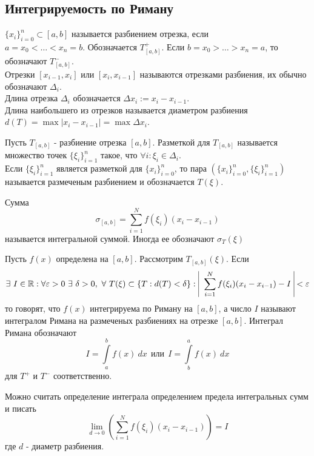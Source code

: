 \subsection{Интегрируемость по Риману}
\begin{definition}
    $\{x_i\}_{i=0}^n\subset [a,b]$ называется разбиением отрезка, если \\
    $a=x_0<\dots<x_n=b$. Обозначается $T_{[a,b]}^+$. Если $b=x_0>\dots>x_n=a$, то обозначают $T_{[a,b]}^-$.\\
    Отрезки $[x_{i-1},x_i]$ или $[x_i, x_{i-1}]$ называются отрезками разбиения, их обычно обозначают $\Delta_i$.\\
    Длина отрезка $\Delta_i$ обозначается $\Delta x_i := x_i-x_{i-1}$. \\
    Длина наибольшего из отрезков называется диаметром разбиения \\
    $d(T)=\max|x_i-x_{i-1}| = \max{\Delta x_i}$. 
\end{definition} 
\begin{definition}
    Пусть $T_{[a,b]}$ - разбиение отрезка $[a,b]$. Разметкой для $T_{[a,b]}$ называется множество точек $\{\xi_i\}_{i=1}^n$ такое, что $\forall i: \xi_i \in \Delta_i$.\\
    Если $\{\xi_i\}_{i=1}^n$ является разметкой для $\{x_i\}_{i=0}^n$, то пара $\left(\{x_i\}_{i=0}^n, \{\xi_i\}_{i=1}^n\right)$ называется размеченым разбиением и обозначается $T(\xi)$.
\end{definition} 
\begin{definition}
    Сумма 
    \[\sigma_{[a,b]}=\sum\limits_{i=1}^{N}f(\xi_i)(x_i-x_{i-1})\]
    называется интегральной суммой. Иногда ее обозначают $\sigma_T(\xi)$
\end{definition} 
\begin{definition}
    Пусть $f(x)$ определена на $[a,b]$. Рассмотрим $T_{[a,b]}(\xi)$. Если \\
    \[\exists\ I\in \R: \forall \epsilon>0\ \exists\ \delta>0,\ \forall\ T(\xi)\subset \{T:d(T)<\delta\}:\ \vline\ \sum\limits_{i=1}^{N}f(\xi_i)(x_i-x_{i-1})-I\ \vline <\epsilon\]
    то говорят, что $f(x)$ интегрируема по Риману на $[a,b]$, а число $I$ называют интегралом Римана на размеченых разбиениях на отрезке $[a,b]$. Интеграл Римана обозначают
    \[I=\int\limits_{a}^{b}f(x)\ dx\ \ \text{или}\ \ I=\int\limits_{b}^{a}f(x)\ dx\]
    для $T^+$ и $T^-$ соответственно. 
\end{definition} 
\begin{comm}
    Можно считать определение интеграла определением предела интегральных сумм и писать
    \[\lim\limits_{d\to 0}\left(\sum\limits_{i=1}^{N}f(\xi_i)(x_i-x_{i-1})\right)=I\]
    где $d$ - диаметр разбиения.
\end{comm} 
